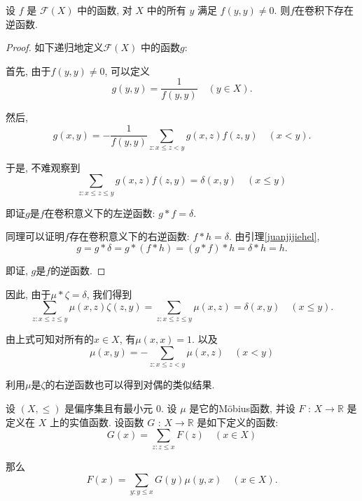\begin{lemma}\label{逆函数引理}
    设 $f$ 是 $\mathcal{F}(X)$ 中的函数, 对 $X$ 中的所有 $y$ 满足 $f(y, y) \neq 0$. 则$f$在卷积下存在逆函数.
\end{lemma}

\begin{proof}
    如下递归地定义$\mathcal{F}(X)$ 中的函数$g$:

    首先, 由于$f(y, y) \neq 0$, 可以定义 $$g(y, y) = \frac{1}{f(y, y)} \quad (y \in X).$$

    然后, $$g(x, y) = -\frac{1}{f(y, y)} \sum_{z:x\leq z < y} g(x, z) f(z, y) \quad (x < y).$$

    于是, 不难观察到 $$\sum_{z:x\leq z \leq y} g(x, z) f(z, y) = \delta(x, y) \quad (x \leq y)$$

    即证$g$是$f$在卷积意义下的左逆函数: $g*f=\delta$.

    同理可以证明$f$存在卷积意义下的右逆函数: $f*h=\delta$. 由引理\ref{juanjijiehel}, $$g = g * \delta = g * (f * h) = (g * f) * h = \delta * h = h.$$

    即证, $g$是$f$的逆函数.
\end{proof}

因此, 由于$\mu*\zeta=\delta$, 我们得到
$$\sum_{z : x \leq z \leq y} \mu(x, z) \zeta(z, y) = \sum_{z : x \leq z \leq y} \mu(x, z)=\delta(x, y) \quad (x \leq y).$$

由上式可知对所有的$x\in X$, 有$\mu(x,x)=1$. 以及$$\mu(x, y) = -\sum_{z : x \leq z < y} \mu(x, z) \quad (x < y)$$

利用$\mu$是$\zeta$的右逆函数也可以得到对偶的类似结果.

\begin{theorem}[Möbius反演]\label{mu反演}
    设 $(X, \leq)$ 是偏序集且有最小元 $0$. 设 $\mu$ 是它的Möbius函数, 并设 $F$ : $X \rightarrow \mathbb{R}$ 是定义在 $X$ 上的实值函数. 设函数 $G$ : $X \rightarrow \mathbb{R}$ 是如下定义的函数:
    \[ G(x) = \sum_{z : z \leq x} F(z) \quad (x \in X) \]

    那么
    \[ F(x) = \sum_{y : y \leq x} G(y) \mu(y, x) \quad (x \in X). \]
\end{theorem}

